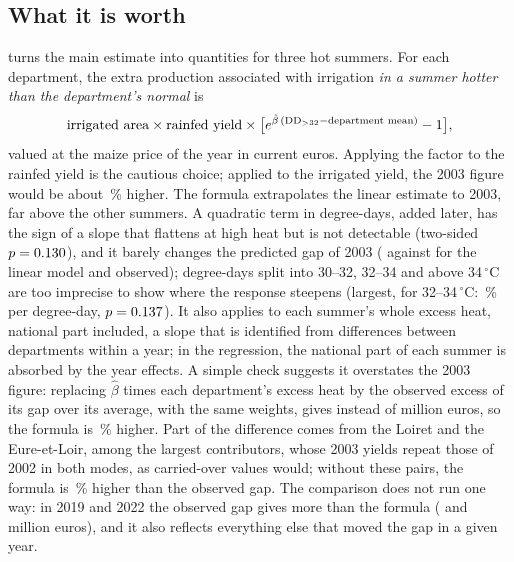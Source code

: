 \subsection{What it is worth}
\label{subsec:maize-value}

 turns the main estimate into quantities for three hot summers. For each department, the extra production associated with irrigation \emph{in a summer hotter than the department's normal} is
\[
\text{irrigated area} \times \text{rainfed yield} \times \big[e^{\hat\beta\,(\mathrm{DD}_{>32} - \text{department mean})} - 1\big],
\]
valued at the maize price of the year in current euros. Applying the factor to the rainfed yield is the cautious choice; applied to the irrigated yield, the 2003 figure would be about \ValAltPct\,\% higher. The formula extrapolates the linear estimate to 2003, far above the other summers. A quadratic term in degree-days, added later, has the sign of a slope that flattens at high heat but is not detectable (two-sided $p = 0.130$), and it barely changes the predicted gap of 2003 (\QuadPredThree{} against \LinPredThree{} for the linear model and \ObsThree{} observed); degree-days split into 30--32, 32--34 and above 34\,$^{\circ}$C are too imprecise to show where the response steepens (largest, for 32--34\,$^{\circ}$C: \BinMidPct\,\% per degree-day, $p = 0.137$). It also applies to each summer's whole excess heat, national part included, a slope that is identified from differences between departments within a year; in the regression, the national part of each summer is absorbed by the year effects. A simple check suggests it overstates the 2003 figure: replacing $\hat\beta$ times each department's excess heat by the observed excess of its gap over its average, with the same weights, gives \QoneValObs{} instead of \QoneValTwoThousandThree{} million euros, so the formula is \ValOverPct\,\% higher. Part of the difference comes from the Loiret and the Eure-et-Loir, among the largest contributors, whose 2003 yields repeat those of 2002 in both modes, as carried-over values would; without these \ValRepPairs{} pairs, the formula is \ValOverNoRepPct\,\% higher than the observed gap. The comparison does not run one way: in 2019 and 2022 the observed gap gives more than the formula (\QoneValObsNineteen{} and \QoneValObsTwentyTwo{} million euros), and it also reflects everything else that moved the gap in a given year.

